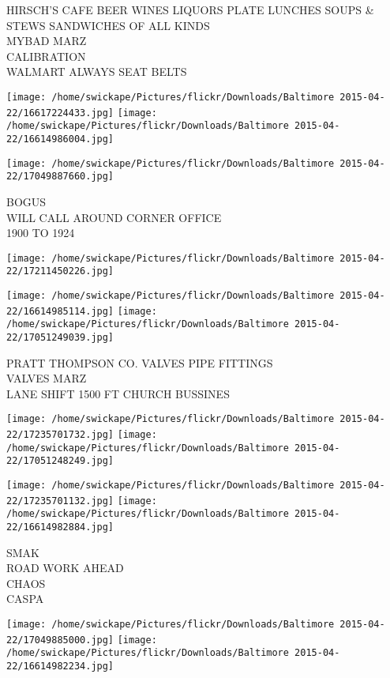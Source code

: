 \documentclass[10pt,letterpaper]{article}
\begin{document}
HIRSCH'S CAFE BEER WINES LIQUORS PLATE LUNCHES SOUPS \& STEWS SANDWICHES OF ALL KINDS\\
MYBAD MARZ\\
CALIBRATION\\
WALMART ALWAYS SEAT BELTS\\
\pagebreak

\texttt{[image: /home/swickape/Pictures/flickr/Downloads/Baltimore 2015-04-22/16617224433.jpg]}
\texttt{[image: /home/swickape/Pictures/flickr/Downloads/Baltimore 2015-04-22/16614986004.jpg]}

\vspace{0.25in}
\texttt{[image: /home/swickape/Pictures/flickr/Downloads/Baltimore 2015-04-22/17049887660.jpg]}

BOGUS\\
WILL CALL AROUND CORNER OFFICE\\
1900 TO 1924\\
\pagebreak

\texttt{[image: /home/swickape/Pictures/flickr/Downloads/Baltimore 2015-04-22/17211450226.jpg]}

\vspace{0.25in}
\texttt{[image: /home/swickape/Pictures/flickr/Downloads/Baltimore 2015-04-22/16614985114.jpg]}
\texttt{[image: /home/swickape/Pictures/flickr/Downloads/Baltimore 2015-04-22/17051249039.jpg]}

PRATT THOMPSON CO. VALVES PIPE FITTINGS\\
VALVES MARZ\\
LANE SHIFT 1500 FT CHURCH BUSSINES\\
\pagebreak

\texttt{[image: /home/swickape/Pictures/flickr/Downloads/Baltimore 2015-04-22/17235701732.jpg]}
\texttt{[image: /home/swickape/Pictures/flickr/Downloads/Baltimore 2015-04-22/17051248249.jpg]}

\texttt{[image: /home/swickape/Pictures/flickr/Downloads/Baltimore 2015-04-22/17235701132.jpg]}
\texttt{[image: /home/swickape/Pictures/flickr/Downloads/Baltimore 2015-04-22/16614982884.jpg]}

SMAK\\
ROAD WORK AHEAD\\
CHAOS\\
CASPA\\
\pagebreak

\texttt{[image: /home/swickape/Pictures/flickr/Downloads/Baltimore 2015-04-22/17049885000.jpg]}
\texttt{[image: /home/swickape/Pictures/flickr/Downloads/Baltimore 2015-04-22/16614982234.jpg]}
\end{document}
